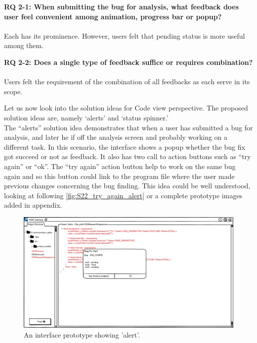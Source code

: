 \begin{myboxi}{{\textbf{RQ 2-1: When submitting the bug for analysis, what feedback does user feel convenient among animation, progress bar or popup?}}}
\\ \\	Each has its prominence. However, users felt that pending status is more useful among them.
\end{myboxi}

\begin{myboxi}{{\textbf{RQ 2-2: Does a single type of feedback suffice or requires combination?}}}
\\ \\	Users felt the requirement of the combination of all feedbacks as each serve in its scope.
\end{myboxi}

Let us now look into the solution ideas for Code view perspective. The proposed solution ideas are, namely ‘alerts’ and ‘status spinner.’ \\


The “alerts” solution idea demonstrates that when a user has submitted a bug for analysis, and later he if off the analysis screen and probably working on a different task. In this scenario,  the interface shows a popup whether the bug fix got succeed or not as feedback. It also has two call to action buttons such as “try again” or “ok”. The “try again” action button help to work on the same bug again and so this button could link to the program file where the user made previous changes concerning the bug finding. This idea could be well understood, looking at following \autoref{fig:S22_try_again_alert} or a complete prototype images added in appendix. \\


\begin{figure}[hbt!]
	\centering
	\includegraphics[width=\linewidth]{figures/solution_ideas_snaps/S22_try_again_alert}
	\caption{An interface prototype showing 'alert'.}
	\label{fig:S22_try_again_alert}
\end{figure}

